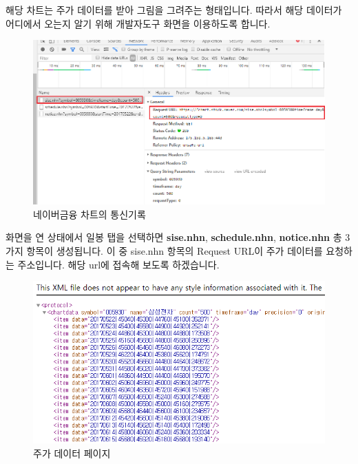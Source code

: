 \documentclass[]{book}
\begin{document}
해당 차트는 주가 데이터를 받아 그림을 그려주는 형태입니다. 따라서 해당 데이터가 어디에서 오는지 알기 위해 개발자도구 화면을 이용하도록 합니다.

\begin{figure}

{\centering \includegraphics[width=1\linewidth]{images/crawl_practice_price2} 

}

\caption{네이버금융 차트의 통신기록}\label{fig:unnamed-chunk-2}
\end{figure}

화면을 연 상태에서 일봉 탭을 선택하면 \textbf{sise.nhn}, \textbf{schedule.nhn}, \textbf{notice.nhn} 총 3가지 항목이 생성됩니다. 이 중 sise.nhn 항목의 Request URL이 주가 데이터를 요청하는 주소입니다. 해당 url에 접속해 보도록 하겠습니다.

\begin{figure}

{\centering \includegraphics[width=1\linewidth]{images/crawl_practice_price3} 

}

\caption{주가 데이터 페이지}\label{fig:unnamed-chunk-3}
\end{figure}
\end{document}
